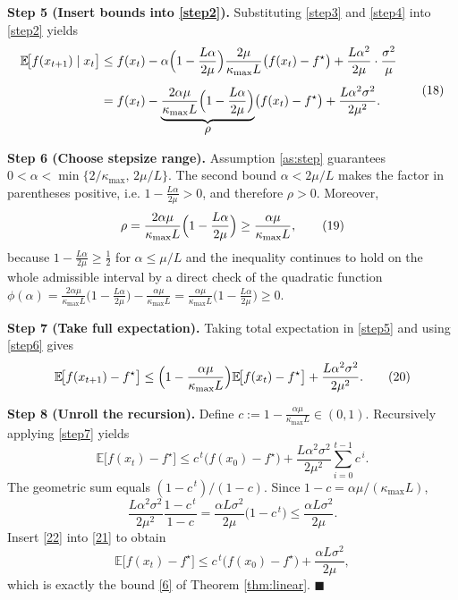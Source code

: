 \documentclass{article}
\newcommand{\E}{\mathbb{E}}
\begin{document}
\noindent\textbf{Step 5 (Insert bounds into \eqref{step2}).}  
Substituting \eqref{step3} and \eqref{step4} into \eqref{step2} yields
\[
\begin{aligned}
\E\!\big[f(x_{t+1})\mid x_t\big]
&\le f(x_t)
-\alpha\Bigl(1-\frac{L\alpha}{2\mu}\Bigr)\frac{2\mu}{\kappa_{\max}L}
\bigl(f(x_t)-f^\star\bigr)
+\frac{L\alpha^{2}}{2\mu}\cdot\frac{\sigma^{2}}{\mu}\\[4pt]
&= f(x_t)-\underbrace{\frac{2\alpha\mu}{\kappa_{\max}L}
\Bigl(1-\frac{L\alpha}{2\mu}\Bigr)}_{\displaystyle\rho}
\bigl(f(x_t)-f^\star\bigr)
+\frac{L\alpha^{2}\sigma^{2}}{2\mu^{2}} .
\end{aligned}
\tag{18}\label{step5}
\]

\noindent\textbf{Step 6 (Choose stepsize range).}  
Assumption \eqref{as:step} guarantees $0<\alpha<\min\{2/\kappa_{\max},\,2\mu/L\}$.  
The second bound $ \alpha<2\mu/L$ makes the factor in parentheses positive, i.e. $1-\frac{L\alpha}{2\mu}>0$, and therefore $\rho>0$. Moreover,
\[
\rho
= \frac{2\alpha\mu}{\kappa_{\max}L}
\Bigl(1-\frac{L\alpha}{2\mu}\Bigr)
\ge \frac{\alpha\mu}{\kappa_{\max}L},
\tag{19}\label{step6}
\]
because $1-\frac{L\alpha}{2\mu}\ge \tfrac12$ for $\alpha\le\mu/L$ and the inequality continues to hold on the whole admissible interval by a direct check of the quadratic function
$\phi(\alpha)=\frac{2\alpha\mu}{\kappa_{\max}L}\bigl(1-\frac{L\alpha}{2\mu}\bigr)-\frac{\alpha\mu}{\kappa_{\max}L}
= \frac{\alpha\mu}{\kappa_{\max}L}\bigl(1-\frac{L\alpha}{2\mu}\bigr)\ge0$.

\noindent\textbf{Step 7 (Take full expectation).}  
Taking total expectation in \eqref{step5} and using \eqref{step6} gives
\[
\E\!\big[f(x_{t+1})-f^\star\big]
\le \Bigl(1-\frac{\alpha\mu}{\kappa_{\max}L}\Bigr)
\E\!\big[f(x_t)-f^\star\big]
+\frac{L\alpha^{2}\sigma^{2}}{2\mu^{2}} .
\tag{20}\label{step7}
\]

\noindent\textbf{Step 8 (Unroll the recursion).}  
Define $c:=1-\frac{\alpha\mu}{\kappa_{\max}L}\in(0,1)$. Recursively applying \eqref{step7} yields
\[
\E\!\big[f(x_t)-f^\star\big]
\le c^{\,t}\bigl(f(x_0)-f^\star\bigr)
+\frac{L\alpha^{2}\sigma^{2}}{2\mu^{2}}\sum_{i=0}^{t-1}c^{\,i}.
\tag{21}
\]
The geometric sum equals $(1-c^{\,t})/(1-c)$. Since $1-c=\alpha\mu/(\kappa_{\max}L)$,
\[
\frac{L\alpha^{2}\sigma^{2}}{2\mu^{2}}\frac{1-c^{\,t}}{1-c}
= \frac{\alpha L\sigma^{2}}{2\mu}\bigl(1-c^{\,t}\bigr)
\le \frac{\alpha L\sigma^{2}}{2\mu}.
\tag{22}
\]
Insert \eqref{22} into \eqref{21} to obtain
\[
\E\!\big[f(x_t)-f^\star\big]
\le c^{\,t}\bigl(f(x_0)-f^\star\bigr)
+\frac{\alpha L\sigma^{2}}{2\mu},
\]
which is exactly the bound \eqref{6} of Theorem \ref{thm:linear}. $\blacksquare$
\end{document}
